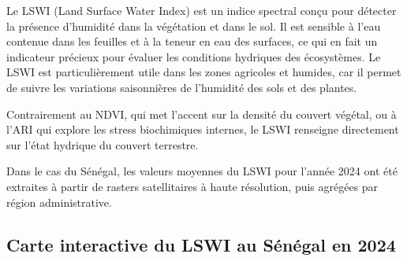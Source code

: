 \documentclass[
]{book}
\begin{document}
Le LSWI (Land Surface Water Index) est un indice spectral conçu pour détecter la présence d'humidité dans la végétation et dans le sol. Il est sensible à l'eau contenue dans les feuilles et à la teneur en eau des surfaces, ce qui en fait un indicateur précieux pour évaluer les conditions hydriques des écosystèmes. Le LSWI est particulièrement utile dans les zones agricoles et humides, car il permet de suivre les variations saisonnières de l'humidité des sols et des plantes.

Contrairement au NDVI, qui met l'accent sur la densité du couvert végétal, ou à l'ARI qui explore les stress biochimiques internes, le LSWI renseigne directement sur l'état hydrique du couvert terrestre.

Dans le cas du Sénégal, les valeurs moyennes du LSWI pour l'année 2024 ont été extraites à partir de rasters satellitaires à haute résolution, puis agrégées par région administrative.

\subsection{Carte interactive du LSWI au Sénégal en 2024}\label{carte-interactive-du-lswi-au-suxe9nuxe9gal-en-2024}
\end{document}
